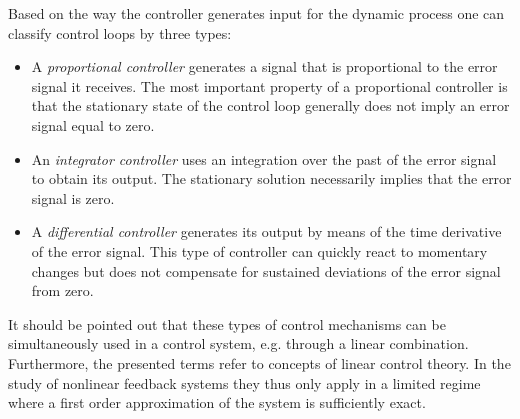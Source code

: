 \documentclass[10pt,a4paper]{article}
\begin{document}
Based on the way the controller generates input for the dynamic process one can classify control loops by three types:
\begin{itemize}
\item A \textit{proportional controller} generates a signal that is proportional to the error signal it receives. The most important property of a proportional controller is that the stationary state of the control loop generally does not imply an error signal equal to zero.
\item An \textit{integrator controller} uses an integration over the past of the error signal to obtain its output. The stationary solution necessarily implies that the error signal is zero.
\item A \textit{differential controller} generates its output by means of the time derivative of the error signal. This type of controller can quickly react to momentary changes but does not compensate for sustained deviations of the error signal from zero.
\end{itemize}
It should be pointed out that these types of control mechanisms can be simultaneously used in a control system, e.g. through a linear combination. Furthermore, the presented terms refer to concepts of linear control theory. In the study of nonlinear feedback systems they thus only apply in a limited regime where a first order approximation of the system is sufficiently exact.
\end{document}
